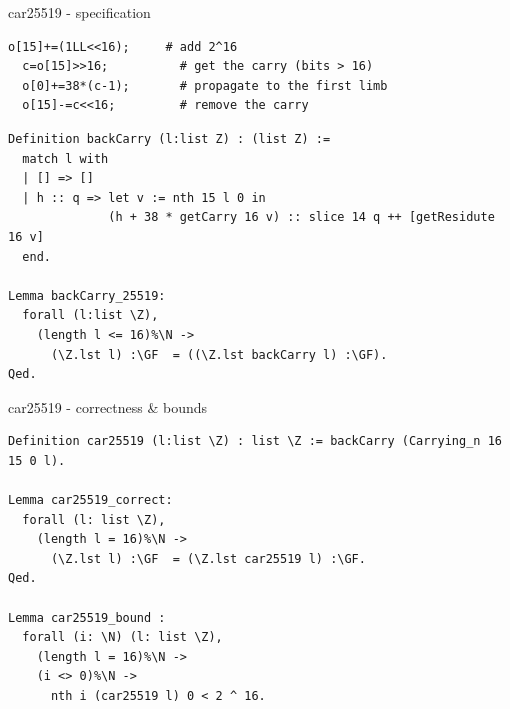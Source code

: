 \documentclass[8pt]{beamer}
\begin{document}
%
%

\begin{frame}[fragile]{car25519 - specification}
  \begin{center}

\begin{lstlisting}[language=cnacl, caption=car25519 | back, label=cod:languageC161]
  o[15]+=(1LL<<16);     # add 2^16
  c=o[15]>>16;          # get the carry (bits > 16)
  o[0]+=38*(c-1);       # propagate to the first limb
  o[15]-=c<<16;         # remove the carry
\end{lstlisting}

\begin{lstlisting}[language=Coq, caption=car25519 | Proofs of correctness, label=cod:languageC162]
Definition backCarry (l:list Z) : (list Z) :=
  match l with
  | [] => []
  | h :: q => let v := nth 15 l 0 in
              (h + 38 * getCarry 16 v) :: slice 14 q ++ [getResidute 16 v]
  end.

Lemma backCarry_25519:
  forall (l:list \Z),
    (length l <= 16)%\N ->
      (\Z.lst l) :\GF  = ((\Z.lst backCarry l) :\GF).
Qed.
\end{lstlisting}

  \end{center}
\end{frame}



%
%

\begin{frame}[fragile]{car25519 - correctness \& bounds}
  \begin{center}
\begin{lstlisting}[language=Coq, caption=car25519 | Proofs of correctness, label=cod:languageC171]
Definition car25519 (l:list \Z) : list \Z := backCarry (Carrying_n 16 15 0 l).

Lemma car25519_correct:
  forall (l: list \Z),
    (length l = 16)%\N ->
      (\Z.lst l) :\GF  = (\Z.lst car25519 l) :\GF.
Qed.

Lemma car25519_bound :
  forall (i: \N) (l: list \Z),
    (length l = 16)%\N ->
    (i <> 0)%\N ->
      nth i (car25519 l) 0 < 2 ^ 16.
\end{lstlisting}
  \end{center}
\end{frame}
\end{document}
